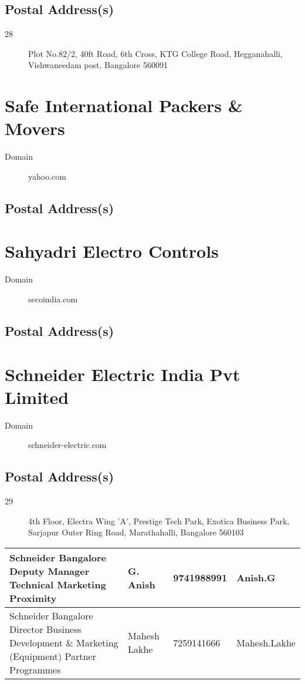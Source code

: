 \documentclass[a4paper, 11pt, twoside]{book}
\begin{document}
\subsection*{Postal Address(s)}
\begin{description}
\item [28]Plot No.82/2, 40ft Road, 6th Cross, KTG College Road, Hegganahalli, Vishwaneedam post, Bangalore 560091
\end{description}
\section{Safe International Packers \& Movers}\label{com:52}
\begin{description}
\item[Domain]yahoo.com
\end{description}
\subsection*{Postal Address(s)}
\section{Sahyadri Electro Controls}\label{com:61}
\begin{description}
\item[Domain]secoindia.com
\end{description}
\subsection*{Postal Address(s)}
\section{Schneider Electric India Pvt Limited}\label{com:16}
\begin{description}
\item[Domain]schneider-electric.com
\end{description}
\subsection*{Postal Address(s)}
\begin{description}
\item [29]4th Floor, Electra Wing 'A', Prestige Tech Park, Exotica Business Park, Sarjapur Outer Ring Road, Marathahalli, Bangalore 560103
\end{description}
\begin{tabular}{|p{4cm}|p{2cm}|p{2cm}|p{3cm}|}
\hline
Schneider Bangalore Deputy Manager Technical Marketing Proximity & G. Anish & 9741988991 & Anish.G \\ \hline
Schneider Bangalore Director Business Development \& Marketing (Equipment) Partner Programmes & Mahesh Lakhe & 7259141666 & Mahesh.Lakhe \\ \hline
\end{tabular}
\end{document}
